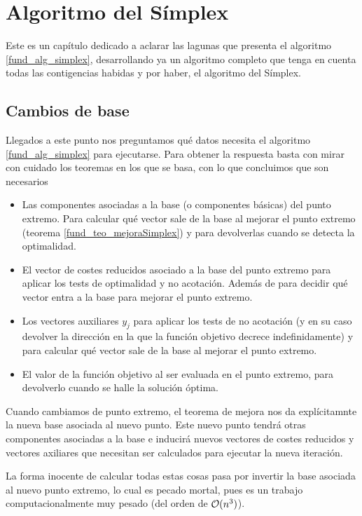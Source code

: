 \chapter{Algoritmo del Símplex}
\label{simp}
Este es un capítulo dedicado a aclarar las lagunas que presenta el algoritmo \ref{fund_alg_simplex}, desarrollando ya un algoritmo completo que tenga en cuenta todas las contigencias habidas y por haber, el algoritmo del Símplex.
\section{Cambios de base}
Llegados a este punto nos preguntamos qué datos necesita el algoritmo \ref{fund_alg_simplex} para ejecutarse. Para obtener la respuesta basta con mirar con cuidado los teoremas en los que se basa, con lo que concluimos que son necesarios
\begin{itemize}
	\item Las componentes asociadas a la base (o componentes básicas) del punto extremo. Para calcular qué vector sale de la base al mejorar el punto extremo (teorema \ref{fund_teo_mejoraSimplex}) y para devolverlas cuando se detecta la optimalidad.
	\item El vector de costes reducidos asociado a la base del punto extremo para aplicar los tests de optimalidad y no acotación. Además de para decidir qué vector entra a la base para mejorar el punto extremo.
	\item Los vectores auxiliares $y_j$ para aplicar los tests de no acotación (y en su caso devolver la dirección en la que la función objetivo decrece indefinidamente) y para calcular qué vector sale de la base al mejorar el punto extremo.
	\item El valor de la función objetivo al ser evaluada en el punto extremo, para devolverlo cuando se halle la solución óptima.
\end{itemize}
Cuando cambiamos de punto extremo, el teorema de mejora nos da explícitamnte la nueva base asociada al nuevo punto. Este nuevo punto tendrá otras componentes asociadas a la base e inducirá nuevos vectores de costes reducidos y vectores axiliares que necesitan ser calculados para ejecutar la nueva iteración.

La forma inocente de calcular todas estas cosas pasa por invertir la base asociada al nuevo punto extremo, lo cual es pecado mortal, pues es un trabajo computacionalmente muy pesado (del orden de $\mathcal{O}(n^3)$).

